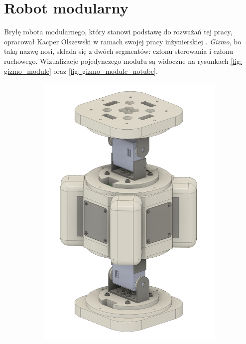 \chapter{Robot modularny}
Bryłę robota modularnego, który stanowi podstawę do rozważań tej pracy, opracował Kacper Olszewski w ramach swojej pracy inżynierskiej \cite{gizmo}. \textit{Gizmo}, bo taką nazwę nosi, składa się z dwóch segmentów: członu sterowania i członu ruchowego. Wizualizacje pojedynczego modułu są widoczne na rysunkach \ref{fig: gizmo_module} oraz \ref{fig: gizmo_module_notube}.

    \begin{figure}[ht!]
        \centering
        \begin{subfigure}[b]{0.45\textwidth}
            \centering
            \includegraphics[width=\textwidth]{rysunki/gizmo/module.png}

\end{subfigure}
\end{figure}
